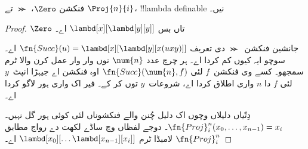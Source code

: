 \documentclass[../../../include/open-logic-section]{subfiles}
\begin{document}

\begin{lem}
فنکشن $\Zero$، $\Succ$ تے $\Proj{n}{i}$، !!{lambda definable} نیں۔
\end{lem}

\begin{proof}
$\Zero$ تاں بس
$\lambd[x][\lambd[y][y]]$ اے۔

جانشین فنکشن~$\Succ$ دی تعریف $\fn{Succ}(u) = \lambd[x][\lambd[y][x(uxy)]]$ اے۔
سوچو ایہ کیوں کم کردا اے۔ ہر چرچ عدد $\num{n}$ نوں وار وار عمل کرن
والا ٹرم سمجھو۔ کسے وی فنکشن~$f$ لئی $\fn{Succ}(\num{n},f)$
اوہ فنکشن اے جیہڑا انپٹ~$y$ لئی $f$ دا $n$ واری اطلاق کردا اے،
شروعات~$y$ توں کر کے۔ فیر اک واری ہور لاگو کردا اے۔

دِتّیاں دلیلاں وچوں اک دلیل چُنن والے فنکشوناں لئی کوئی ہور گل نہیں۔
$\fn{Proj}^n_i(x_0, \dots,
x_{n-1}) = x_i$۔ دوجے لفظاں وچ ساڈے لکھت دے رواج مطابق $\fn{Proj}^n_i$
لامبڈا ٹرم $\lambd[x_0][\dots \lambd[x_{n-1}][x_i]]$ اے۔
\end{proof}
\end{document}
